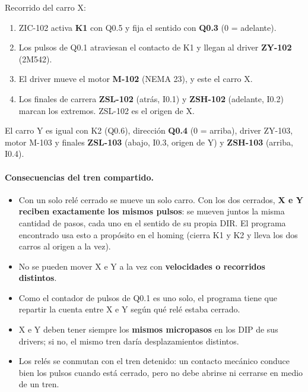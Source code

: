 \documentclass[11pt]{article}
\begin{document}
Recorrido del carro X:
\begin{enumerate}
\item ZIC-102 activa \textbf{K1} con Q0.5 y fija el sentido con \textbf{Q0.3} (0 = adelante).
\item Los pulsos de Q0.1 atraviesan el contacto de K1 y llegan al driver \textbf{ZY-102} (2M542).
\item El driver mueve el motor \textbf{M-102} (NEMA 23), y este el carro X.
\item Los finales de carrera \textbf{ZSL-102} (atrás, I0.1) y \textbf{ZSH-102} (adelante, I0.2) marcan los extremos. ZSL-102 es el origen de X.
\end{enumerate}
El carro Y es igual con K2 (Q0.6), dirección \textbf{Q0.4} (0 = arriba), driver ZY-103, motor M-103 y finales \textbf{ZSL-103} (abajo, I0.3, origen de Y) y \textbf{ZSH-103} (arriba, I0.4).

\paragraph{Consecuencias del tren compartido.}
\begin{itemize}
\item Con un solo relé cerrado se mueve un solo carro. Con los dos cerrados, \textbf{X e Y reciben exactamente los mismos pulsos}: se mueven juntos la misma cantidad de pasos, cada uno en el sentido de su propia DIR. El programa encontrado usa esto a propósito en el homing (cierra K1 y K2 y lleva los dos carros al origen a la vez).
\item No se pueden mover X e Y a la vez con \textbf{velocidades o recorridos distintos}.
\item Como el contador de pulsos de Q0.1 es uno solo, el programa tiene que repartir la cuenta entre X e Y según qué relé estaba cerrado.
\item X e Y deben tener siempre los \textbf{mismos micropasos} en los DIP de sus drivers; si no, el mismo tren daría desplazamientos distintos.
\item Los relés se conmutan con el tren detenido: un contacto mecánico conduce bien los pulsos cuando está cerrado, pero no debe abrirse ni cerrarse en medio de un tren.
\end{itemize}
\end{document}
